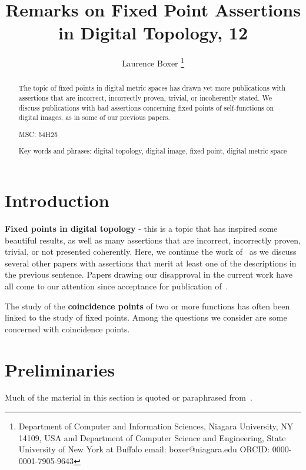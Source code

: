 \documentclass{article}
\numberwithin{thm}{section}
\begin{document}
\title{Remarks on Fixed Point Assertions in Digital Topology, 12}
\author{Laurence Boxer
\thanks{Department of Computer and Information Sciences, Niagara University, NY 14109, USA
and  \newline
Department of Computer Science and Engineering, State University of New York at Buffalo \newline
email: boxer@niagara.edu
\newline
ORCID: 0000-0001-7905-9643
}
}

\date{ }
\maketitle

\begin{abstract} The topic of fixed points in digital metric spaces has drawn yet more
publications with assertions that are incorrect, incorrectly proven, trivial, or
incoherently stated. We discuss publications with 
bad assertions concerning fixed points of self-functions on digital images, as in some of
our previous papers.

MSC: 54H25

Key words and phrases: digital topology, digital image,
fixed point, digital metric space
\end{abstract}

\section{Introduction}
{\bf Fixed points in digital topology} - this is a topic that has inspired some beautiful
results, as well as many assertions that 
are incorrect, incorrectly
proven, trivial, or not presented coherently. Here, we continue the work
of~\cite{BxSt19, Bx19, Bx19-3, Bx20, Bx22, BxBad6, BxBad7, BxBad8, BxBad9, BxBad10, BxBad11}
as we discuss several other papers with 
assertions that merit at least one of the 
descriptions in the previous sentence. 
Papers drawing our disapproval in
the current work have all come to our attention since acceptance for publication
of~\cite{BxBad11}.

The study of the {\bf coincidence points}
of two or more functions has often been 
linked to the study of fixed points. Among the
questions we consider are some concerned with
coincidence points.

\section{Preliminaries}
Much of the material in this section is 
quoted or paraphrased from~\cite{BxBad10}.
\end{document}
